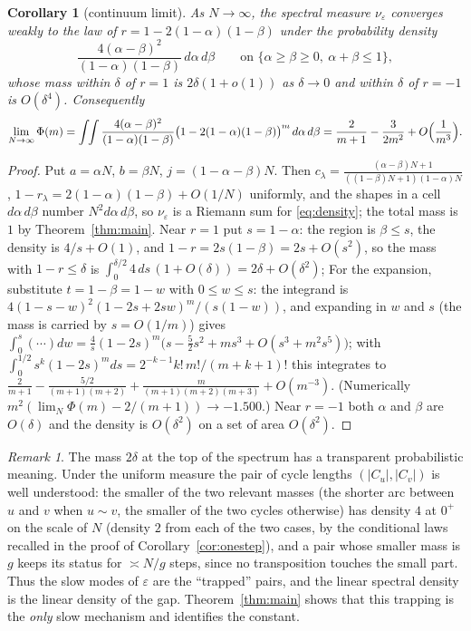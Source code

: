 \documentclass[11pt]{amsart}
\newtheorem{corollary}[theorem]{Corollary}
\theoremstyle{remark}
\newtheorem{remark}[theorem]{Remark}
\begin{document}
\begin{corollary}[continuum limit]\label{cor:cont}
As $N\to\infty$, the spectral measure $\nu_\varepsilon$ converges weakly to the law of $r=1-2(1-\alpha)(1-\beta)$ under the probability density
\begin{equation}\label{eq:density}
\frac{4(\alpha-\beta)^2}{(1-\alpha)(1-\beta)}\,d\alpha\,d\beta
\qquad\text{on }\{\alpha\ge\beta\ge0,\ \alpha+\beta\le1\},
\end{equation}
whose mass within $\delta$ of $r=1$ is $2\delta(1+o(1))$ as $\delta\to0$ and within $\delta$ of $r=-1$ is $O(\delta^4)$.  Consequently
\begin{equation}\label{eq:cont}
\lim_{N\to\infty}\Phi(m)=\int\!\!\int\frac{4(\alpha-\beta)^2}{(1-\alpha)(1-\beta)}\bigl(1-2(1-\alpha)(1-\beta)\bigr)^m\,d\alpha\,d\beta
=\frac{2}{m+1}-\frac{3}{2m^2}+O\Bigl(\frac1{m^3}\Bigr).
\end{equation}
\end{corollary}

\begin{proof}
Put $a=\alpha N$, $b=\beta N$, $j=(1-\alpha-\beta)N$.  Then $c_\lambda=\frac{(\alpha-\beta)N+1}{((1-\beta)N+1)(1-\alpha)N}$, $1-r_\lambda=2(1-\alpha)(1-\beta)+O(1/N)$ uniformly, and the shapes in a cell $d\alpha\,d\beta$ number $N^2d\alpha\,d\beta$, so $\nu_\varepsilon$ is a Riemann sum for \eqref{eq:density}; the total mass is $1$ by Theorem~\ref{thm:main}.  Near $r=1$ put $s=1-\alpha$: the region is $\beta\le s$, the density is $4/s+O(1)$, and $1-r=2s(1-\beta)=2s+O(s^2)$, so the mass with $1-r\le\delta$ is $\int_0^{\delta/2}4\,ds\,(1+O(\delta))=2\delta+O(\delta^2)$; For the expansion, substitute $t=1-\beta=1-w$ with $0\le w\le s$: the integrand is $4(1-s-w)^2(1-2s+2sw)^m/(s(1-w))$, and expanding in $w$ and $s$ (the mass is carried by $s=O(1/m)$) gives $\int_0^s(\cdots)dw=\frac4s(1-2s)^m\bigl(s-\tfrac52s^2+ms^3+O(s^3+m^2s^5)\bigr)$; with $\int_0^{1/2}s^k(1-2s)^mds=2^{-k-1}k!\,m!/(m+k+1)!$ this integrates to $\frac2{m+1}-\frac{5/2}{(m+1)(m+2)}+\frac{m}{(m+1)(m+2)(m+3)}+O(m^{-3})$.  (Numerically $m^2(\lim_N\Phi(m)-2/(m+1))\to-1.500$.)  Near $r=-1$ both $\alpha$ and $\beta$ are $O(\delta)$ and the density is $O(\delta^2)$ on a set of area $O(\delta^2)$.
\end{proof}

\begin{remark}
The mass $2\delta$ at the top of the spectrum has a transparent probabilistic meaning.  Under the uniform measure the pair of cycle lengths $(|C_u|,|C_v|)$ is well understood: the smaller of the two relevant masses (the shorter arc between $u$ and $v$ when $u\sim v$, the smaller of the two cycles otherwise) has density $4$ at $0^+$ on the scale of $N$ (density $2$ from each of the two cases, by the conditional laws recalled in the proof of Corollary~\ref{cor:onestep}), and a pair whose smaller mass is $g$ keeps its status for $\asymp N/g$ steps, since no transposition touches the small part.  Thus the slow modes of $\varepsilon$ are the ``trapped'' pairs, and the linear spectral density is the linear density of the gap.  Theorem~\ref{thm:main} shows that this trapping is the \emph{only} slow mechanism and identifies the constant.
\end{remark}
\end{document}
